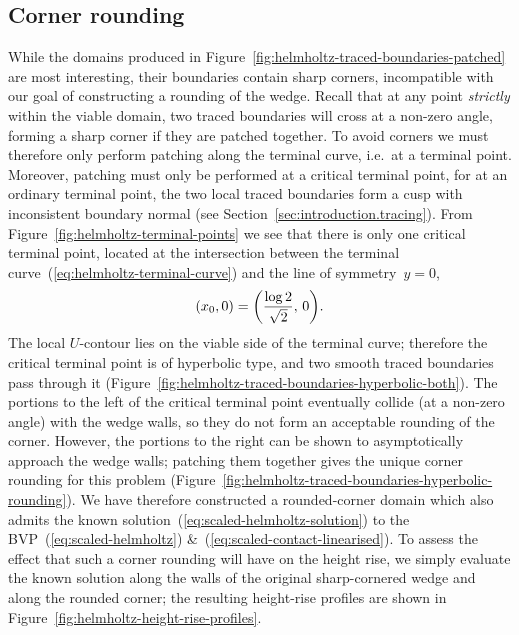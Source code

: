 \subsection{Corner rounding}
\label{sec:moderate.linearised.rounding}

While the domains produced in
Figure~\ref{fig:helmholtz-traced-boundaries-patched}
are most interesting,
their boundaries contain sharp corners,
incompatible with our goal of constructing a rounding of the wedge.
Recall that at any point \emph{strictly} within the viable domain,
two traced boundaries will cross at a non-zero angle,
forming a sharp corner if they are patched together.
To avoid corners we must therefore only perform patching
along the terminal curve, i.e.~at a terminal point.
Moreover, patching must only be performed at a critical terminal point,
for at an ordinary terminal point,
the two local traced boundaries form a cusp with inconsistent boundary normal
(see Section~\ref{sec:introduction.tracing}).
From Figure~\ref{fig:helmholtz-terminal-points}
we see that there is only one critical terminal point,
located at the intersection between
the terminal curve~(\ref{eq:helmholtz-terminal-curve})
and the line of symmetry~$y = 0$,
\begin{equation}
  (x_0, 0) = \roundbr*{\frac{\log 2}{\sqrt{2}}, \, 0}.
  \label{eq:helmholtz-critical-terminal-point}
\end{equation}
The local $U$-contour lies on the viable side of the terminal curve;
therefore the critical terminal point is of hyperbolic type,
and two smooth traced boundaries pass through it
(Figure~\ref{fig:helmholtz-traced-boundaries-hyperbolic-both}).
The portions to the left of the critical terminal point
eventually collide (at a non-zero angle) with the wedge walls,
so they do not form an acceptable rounding of the corner.
However, the portions to the right
can be shown to asymptotically approach the wedge walls;
patching them together gives the unique corner rounding for this problem
(Figure~\ref{fig:helmholtz-traced-boundaries-hyperbolic-rounding}).
We have therefore constructed a rounded-corner domain
which also admits the known solution~(\ref{eq:scaled-helmholtz-solution})
to the BVP~(\ref{eq:scaled-helmholtz})
\&~(\ref{eq:scaled-contact-linearised}).
To assess the effect that such a corner rounding will have
on the height rise,
we simply evaluate the known solution
along the walls of the original sharp-cornered wedge
and along the rounded corner;
the resulting height-rise profiles are shown in
Figure~\ref{fig:helmholtz-height-rise-profiles}.


